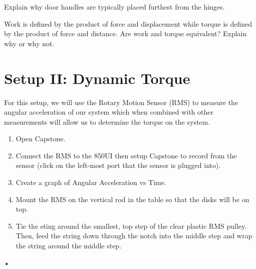 \documentclass[main.tex]{subfiles}
\begin{document}
\begin{question}
Explain why door handles are typically placed furthest from the hinges.
\end{question}

\begin{question}
Work is defined by the product of force and displacement while torque is defined by the product of force and distance. Are work and torque equivalent? Explain why or why not.
\end{question}

\section{Setup II: Dynamic Torque}
For this setup, we will use the Rotary Motion Sensor (RMS) to measure the angular acceleration of our system which when combined with other measurements will allow us to determine the torque on the system.
\begin{enumerate}
\item
Open Capstone.
\item
Connect the RMS to the 850UI then setup Capstone to record from the sensor (click on the left-most port that the sensor is plugged into).
\item
Create a graph of Angular Acceleration vs Time.
\item
Mount the RMS on the vertical rod in the table so that the disks will be on top.
\item 
Tie the sting around the smallest, top step of the clear plastic RMS pulley. Then, feed the string down through the notch into the middle step and wrap the string around the middle step.
\end{enumerate}•
\end{document}
